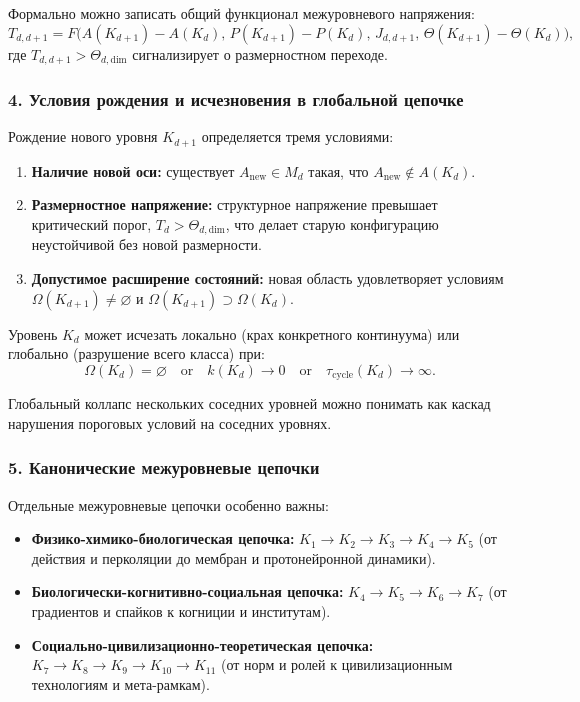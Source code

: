 Формально можно записать общий функционал межуровневого напряжения:
\[
T_{d,d+1} = F\bigl(
  A(K_{d+1}) - A(K_d),\,
  P(K_{d+1}) - P(K_d),\,
  J_{d,d+1},\,
  \Theta(K_{d+1}) - \Theta(K_d)
\bigr),
\]
где $T_{d,d+1} > \Theta_{d,\text{dim}}$ сигнализирует о размерностном
переходе.

\subsubsection{4. Условия рождения и исчезновения в глобальной цепочке}

Рождение нового уровня $K_{d+1}$ определяется тремя условиями:
\begin{enumerate}
  \item \textbf{Наличие новой оси:}
        существует $A_{\text{new}} \in M_d$ такая, что
        $A_{\text{new}} \notin A(K_d)$.
  \item \textbf{Размерностное напряжение:}
        структурное напряжение превышает критический порог,
        $T_d > \Theta_{d,\text{dim}}$, что делает старую конфигурацию
        неустойчивой без новой размерности.
  \item \textbf{Допустимое расширение состояний:}
        новая область удовлетворяет условиям
        $\Omega(K_{d+1}) \neq \varnothing$ и
        $\Omega(K_{d+1}) \supset \Omega(K_d)$.
\end{enumerate}

Уровень $K_d$ может исчезать локально (крах конкретного
континуума) или глобально (разрушение всего класса) при:
\[
\Omega(K_d) = \varnothing
\quad\text{or}\quad
k(K_d) \rightarrow 0
\quad\text{or}\quad
\tau_{\text{cycle}}(K_d) \rightarrow \infty.
\]

Глобальный коллапс нескольких соседних уровней можно понимать как каскад
нарушения пороговых условий на соседних уровнях.

\subsubsection{5. Канонические межуровневые цепочки}

Отдельные межуровневые цепочки особенно важны:

\begin{itemize}
  \item \textbf{Физико-химико-биологическая цепочка:}
        $K_1 \rightarrow K_2 \rightarrow K_3 \rightarrow K_4 \rightarrow K_5$
        (от действия и перколяции до мембран и протонейронной динамики).
  \item \textbf{Биологически-когнитивно-социальная цепочка:}
        $K_4 \rightarrow K_5 \rightarrow K_6 \rightarrow K_7$ (от градиентов
        и спайков к когниции и институтам).
  \item \textbf{Социально-цивилизационно-теоретическая цепочка:}
        $K_7 \rightarrow K_8 \rightarrow K_9 \rightarrow K_{10} \rightarrow K_{11}$
        (от норм и ролей к цивилизационным технологиям и
        мета-рамкам).
\end{itemize}

